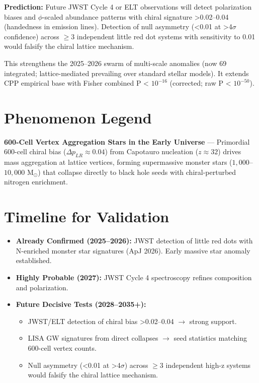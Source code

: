 \documentclass[11pt]{article}
\begin{document}
\textbf{Prediction:} Future JWST Cycle 4 or ELT observations will detect polarization biases and $\phi$-scaled abundance patterns with chiral signature >0.02--0.04 (handedness in emission lines). Detection of null asymmetry (<0.01 at >4$\sigma$ confidence) across $\geq 3$ independent little red dot systems with sensitivity to 0.01 would falsify the chiral lattice mechanism.

This strengthens the 2025--2026 swarm of multi-scale anomalies (now 69 integrated; lattice-mediated prevailing over standard stellar models). It extends CPP empirical base with Fisher combined P < $10^{-16}$ (corrected; raw P < $10^{-50}$).

\section{Phenomenon Legend}
\textbf{600-Cell Vertex Aggregation Stars in the Early Universe} — Primordial 600-cell chiral bias ($\Delta p_{LR} \approx 0.04$) from Capotauro nucleation ($z \approx 32$) drives mass aggregation at lattice vertices, forming supermassive monster stars ($1{,}000$--$10{,}000$ M$_\odot$) that collapse directly to black hole seeds with chiral-perturbed nitrogen enrichment.

\section{Timeline for Validation}
\begin{itemize}
    \item \textbf{Already Confirmed (2025--2026):} JWST detection of little red dots with N-enriched monster star signatures (ApJ 2026). Early massive star anomaly established.
    \item \textbf{Highly Probable (2027):} JWST Cycle 4 spectroscopy refines composition and polarization.
    \item \textbf{Future Decisive Tests (2028--2035+):}
    \begin{itemize}
        \item JWST/ELT detection of chiral bias >0.02--0.04 $\to$ strong support.
        \item LISA GW signatures from direct collapses $\to$ seed statistics matching 600-cell vertex counts.
        \item Null asymmetry (<0.01 at >4$\sigma$) across $\geq 3$ independent high-z systems would falsify the chiral lattice mechanism.
    \end{itemize}
\end{itemize}
\end{document}

